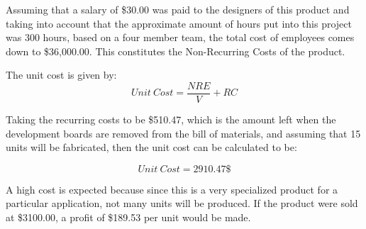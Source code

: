 \begin{landscape}
{\begin{center}
\begin{longtable}{|p{1.5in}|c|c|c|c|c|c|}
    
\end{longtable}%
\end{center}
}
 \end{landscape}
 \newpage
 
Assuming that a salary of \$30.00 was paid to the designers of this product and taking into account that the approximate amount of hours put into this project was 300 hours, based on a four member team, the total cost of employees comes down to \$36,000.00.  This constitutes the Non-Recurring Costs of the product.

The unit cost is given by:
\[Unit~Cost = \frac{NRE}{V} + RC\]

Taking the recurring costs to be \$510.47, which is the amount left when the development boards are removed from the bill of materials, and assuming that 15 units will be fabricated, then the unit cost can be calculated to be:

\[\boxed{Unit~Cost = 2910.47 \$}\]

A high cost is expected because since this is a very specialized product for a particular application, not many units will be produced. If the product were sold at \$3100.00, a profit of \$189.53 per unit would be made.
